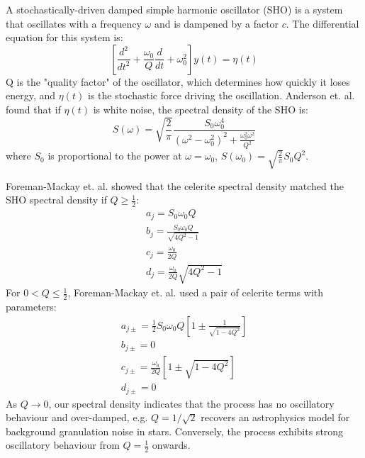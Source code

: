 A stochastically-driven damped simple harmonic oscillator (SHO) is a system that oscillates with a frequency $\omega$ and is dampened by a factor $c$. The differential equation for this system is:
\begin{equation*}
    \left[ \frac{d^2}{dt^2} + \frac{\omega_0}{Q} \frac{d}{dt} + \omega_0^2 \right] y(t) = \eta(t)
\end{equation*}
Q is the "quality factor" of the oscillator, which determines how quickly it loses energy, and $\eta(t)$ is the stochastic force driving the oscillation. Anderson et. al. \cite{sho-spectral-density} found that if $\eta(t)$ is white noise, the spectral density of the SHO is:
\begin{equation*}
    S(\omega) = \sqrt{\frac{2}{\pi}} \frac{S_0 \omega_0^4}{(\omega^2 - \omega_0^2)^2 + \frac{\omega_0^2 \omega^2}{Q^2}}
\end{equation*}
where $S_0$ is proportional to the power at $\omega = \omega_0$, $S(\omega_0) = \sqrt{\frac{2}{\pi}} S_0 Q^2$. 

Foreman-Mackay et. al. \cite{foreman-mackay} showed that the celerite spectral density matched the SHO spectral density if $Q \geq \frac{1}{2}$:
\begin{equation*}
    \begin{aligned}
        a_j = S_0 \omega_0 Q \\
        b_j = \frac{S_0 \omega_0 Q}{\sqrt{4Q^2 - 1}} \\
        c_j = \frac{\omega_0}{2Q} \\
        d_j = \frac{\omega_0}{2Q} \sqrt{4Q^2 - 1}
    \end{aligned}
\end{equation*}
For $0 < Q \leq \frac{1}{2}$, Foreman-Mackay et. al. \cite{foreman-mackay} used a pair of celerite terms with parameters:
\begin{equation*}
    \begin{aligned}
        a_{j \pm} = \frac{1}{2} S_0 \omega_0 Q \left[ 1 \pm \frac{1}{\sqrt{1 - 4Q^2}} \right] \\
        b_{j \pm} = 0 \\
        c_{j \pm} = \frac{\omega_0}{2Q} \left[ 1 \pm \sqrt{1 - 4Q^2} \right] \\
        d_{j \pm} = 0
    \end{aligned}
\end{equation*}
As $Q \to 0$, our spectral density indicates that the process has no oscillatory behaviour and over-damped, e.g. $Q = 1 / \sqrt{2}$ recovers an astrophysics model \cite{sho-noise-astro} for background granulation noise in stars. Conversely, the process exhibits strong oscillatory behaviour from $Q = \frac{1}{2}$ onwards.

